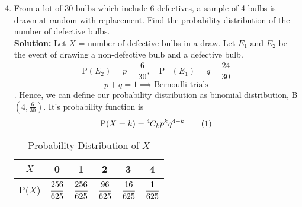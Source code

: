 \documentclass{article}
\providecommand{\brak}[1]{\ensuremath{\left(#1\right)}}
\newcommand{\solution}{\noindent \textbf{Solution: }}
\newcommand*{\permcomb}[4][0mu]{{{}^{#3}\mkern#1#2_{#4}}}
\newcommand*{\comb}[1][-1mu]{\permcomb[#1]{C}}
\newcommand\numberthis{\addtocounter{equation}{1}\tag{\theequation}}
\newcommand\T{\rule{0pt}{2.6ex}}       %
\begin{document}
\begin{enumerate}[label=13.\arabic{enumi}.\arabic{enumii}]
\setcounter{enumi}{3}
\setcounter{enumii}{6}
\item From a lot of 30 bulbs which include 6 defectives, a sample of 4 bulbs is drawn at random with replacement. Find the probability distribution of the number of defective bulbs.\\[1ex]
	\solution
		Let $X$ = number of defective bulbs in a draw. Let $E_1 \text{ and } E_2$ be the event of drawing a non-defective bulb and a defective bulb.
	\begin{align*}
		\text{P}(E_2)= p = \dfrac{6}{30}, \quad \text{P}&(E_1)= q = \dfrac{24}{30}
	\end{align*}
		\[p+q=1 \implies \text{Bernoulli trials}\].
		Hence, we can define our probability distribution as binomial distribution, B$\brak{4,\frac{6}{30}}$. It's probability function is \[\text{P($X=k$)}=\comb{4}{k}p^kq^{4-k} \numberthis \]
	\begin{table}[h!]
	\normalsize
	\centering
			\begin{tabular}[20pt]{|c|c|c|c|c|c|} \hline		%
			$X$&0&1&2&3&4 \T \\ \hline
			P($X$)&$\cfrac{256}{625}$&$\cfrac{256}{625}$&$\cfrac{96}{625}$&$\cfrac{16}{625}$&$\cfrac{1}{625}$\\[1.5ex] \hline
		\end{tabular}\\[2ex]
		\caption{Probability Distribution of $X$}
	\end{table}

\noindent{}

\end{enumerate}
\end{document}
